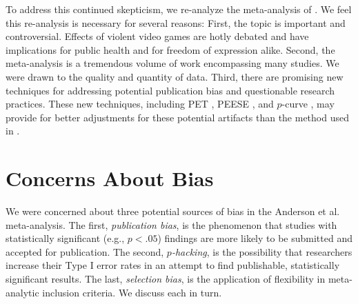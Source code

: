 \documentclass[man, mask]{apa6}
\begin{document}
To address this continued skepticism, we re-analyze the meta-analysis of \citet{Anderson:etal:2010}. We feel this re-analysis is necessary for several reasons:  First, the topic is important and controversial. Effects of violent video games are hotly debated and have implications for public health and for freedom of expression alike. Second, the \citet{Anderson:etal:2010} meta-analysis is a tremendous volume of work encompassing many studies. We were drawn to the quality and quantity of data. Third, there are promising new techniques for addressing potential publication bias and questionable research practices.  These new techniques, including PET \citep[Precision-Effect Test,][]{Stanley:Doucouliagos:2014}, PEESE \citep[Precision-Effect Estimate with Standard Error,][]{Stanley:Doucouliagos:2014}, and $p$-curve \citep{Simonsohn:etal:2014,Simonsohn:etal:2014b}, may provide for better adjustments for these potential artifacts than the method used in \citet{Anderson:etal:2010}. 


\section{Concerns About Bias}
We were concerned about three potential sources of bias in the Anderson et al. meta-analysis. The first, {\em publication bias}, is the phenomenon that studies with statistically significant (e.g., $p<.05$) findings are more likely to be submitted and accepted for publication. The second, {\em $p$-hacking}, is the possibility that researchers increase their Type I error rates in an attempt to find publishable, statistically significant results. The last, {\em selection bias}, is the application of flexibility in meta-analytic inclusion criteria. We discuss each in turn.
\end{document}
